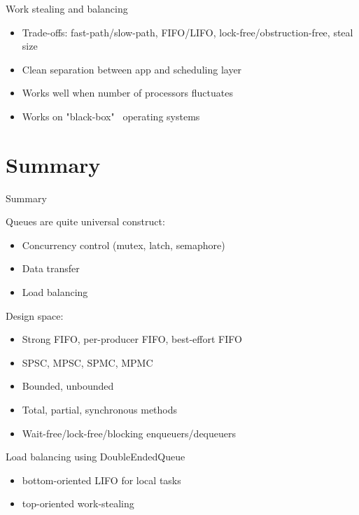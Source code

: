 \begin{frame}{Work stealing and balancing}

\begin{itemize}
  \item Trade-offs: fast-path/slow-path, FIFO/LIFO, lock-free/obstruction-free, steal size
  \pause \item Clean separation between app and scheduling layer
  \pause \item Works well when number of processors fluctuates
  \pause \item Works on "black-box" \ operating systems
\end{itemize}

\end{frame}

\section{Summary}

\begin{frame}{Summary}

Queues are quite universal construct:
\begin{itemize}
  \item Concurrency control (mutex, latch, semaphore)
  \item Data transfer
  \item Load balancing
\end{itemize}

Design space:
\begin{itemize}
  \item Strong FIFO, per-producer FIFO, best-effort FIFO
  \item SPSC, MPSC, SPMC, MPMC  
  \item Bounded, unbounded
  \item Total, partial, synchronous methods
  \item Wait-free/lock-free/blocking enqueuers/dequeuers
\end{itemize}

Load balancing using DoubleEndedQueue
\begin{itemize}
  \item bottom-oriented LIFO for local tasks
  \item top-oriented work-stealing
\end{itemize}

\end{frame}




